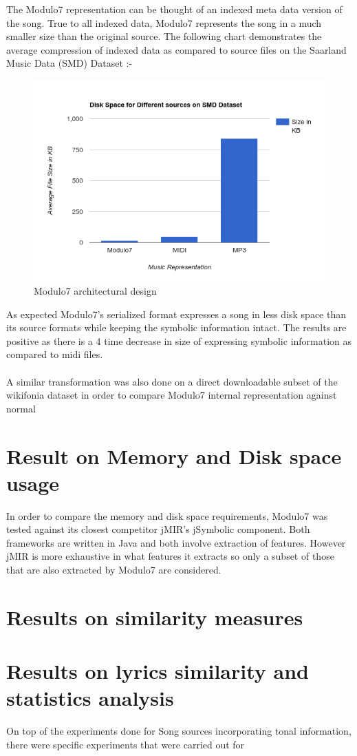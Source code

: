 \noindent The Modulo7 representation can be thought of an indexed meta data version of the song. True to all indexed data, Modulo7 represents the song in a much smaller size than the original source. The following chart demonstrates the average compression of indexed data as compared to source files on the Saarland Music Data (SMD) Dataset \cite{saarlandmsd}:-
\begin{figure}
\centering
\includegraphics[width=\textwidth]{Modulo7SMDBarGraph.png}
\makeatletter
\let\@currsize\normalsize
\caption{Modulo7 architectural design}
\label{fig:figure}
\end{figure}
As expected Modulo7's serialized format expresses a song in less disk space than its source formats while keeping the symbolic information intact. The results are positive as there is a 4 time decrease in size of expressing symbolic information as compared to midi files. \\\\
A similar transformation was also done on a direct downloadable subset of the wikifonia dataset in order to compare Modulo7 internal representation against normal 

\section{Result on Memory and Disk space \\ usage}

\noindent In order to compare the memory and disk space requirements, Modulo7 was tested against its closest competitor jMIR's \cite{jMIR} jSymbolic component. Both frameworks are written in Java and both involve extraction of features. However jMIR is more exhaustive in what features it extracts so only a subset of those that are also extracted by Modulo7 are considered. 


\section{Results on similarity measures}

\section{Results on lyrics similarity and statistics analysis}

\noindent On top of the experiments done for Song sources incorporating tonal information, there were specific experiments that were carried out for 
